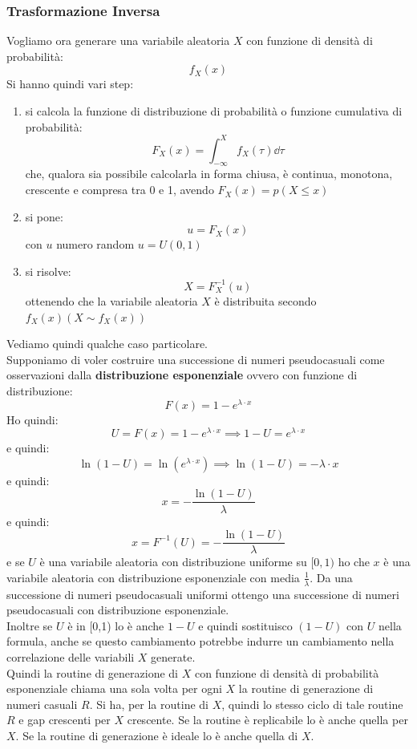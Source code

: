 \documentclass[a4paper,12pt, oneside]{book}
\begin{document}
\subsubsection{Trasformazione Inversa}
Vogliamo ora generare una variabile aleatoria $X$ con funzione di densità di
probabilità:
\[f_X(x)\]
Si hanno quindi vari step:
\begin{enumerate}
  \item si calcola la funzione di distribuzione di probabilità o funzione
  cumulativa di probabilità:
  \[F_X(x)=\int_{-\infty}^Xf_X(\tau)\dd{\tau}\]
  che, qualora sia possibile calcolarla in forma chiusa, è continua, monotona,
  crescente e compresa tra 0 e 1, avendo $F_X(x)=p(X\leq x)$
  \item si pone:
  \[u=F_X(x)\]
  con $u$ numero random $u=U(0,1)$
  \item si risolve:
  \[X=F_X^{-1}(u)\]
  ottenendo che la variabile aleatoria $X$ è distribuita secondo $f_X(x)(X\sim
  f_X(x))$ 
\end{enumerate}
Vediamo quindi qualche caso particolare.\\
Supponiamo di voler costruire una successione di numeri pseudocasuali come
osservazioni dalla \textbf{distribuzione esponenziale} ovvero con funzione di
distribuzione:
\[F(x)=1-e^{\lambda\cdot x}\]
Ho quindi:
\[U=F(x)=1-e^{\lambda\cdot x}\implies 1-U=e^{\lambda\cdot x}\]
e quindi:
\[\ln(1-U)=\ln(e^{\lambda\cdot x})\implies \ln(1-U)=-\lambda\cdot x\]
e quindi:
\[x=-\frac{\ln(1-U)}{\lambda}\]
e quindi:
\[x=F^{-1}(U)=-\frac{\ln(1-U)}{\lambda}\]
e se $U$ è una variabile aleatoria con distribuzione uniforme su $[0,1)$ ho che
$x$ è una variabile aleatoria con distribuzione esponenziale con media
$\frac{1}{\lambda}$. Da una successione di numeri pseudocasuali uniformi ottengo
una successione di numeri pseudocasuali con distribuzione esponenziale. \\
Inoltre se $U$ è in [0,1) lo è anche $1-U$ e quindi sostituisco $(1-U)$ con $U$
nella formula, anche se questo cambiamento potrebbe indurre un cambiamento nella
correlazione delle variabili $X$ generate. \\
Quindi la routine di generazione di $X$ con funzione di densità di probabilità
esponenziale chiama una sola volta per ogni $X$ la routine di generazione di
numeri casuali $R$. Si ha, per la routine di $X$, quindi lo stesso ciclo di tale
routine $R$ e gap crescenti per 
$X$ crescente. Se la routine è replicabile lo è anche quella per $X$. Se la
routine di generazione è ideale lo è anche quella di $X$.\\
\end{document}
